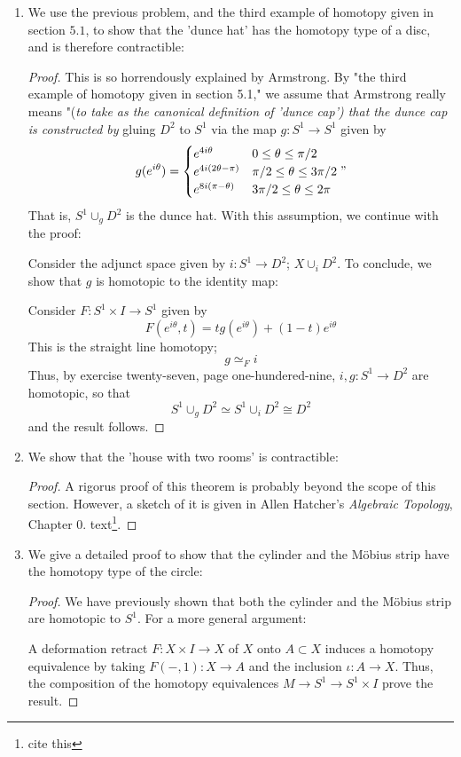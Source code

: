 \documentclass{book}
\begin{document}
\begin{enumerate}[(1)]
    \item We use the previous problem, and the third example of homotopy given in section $5.1$, to show that the 'dunce hat' has the homotopy type of a disc, and is therefore contractible: 
        \begin{proof} This is so horrendously explained by Armstrong. By "the third example of homotopy given in section 5.1," we assume that Armstrong really means "(\textit{to take as the canonical definition of 'dunce cap') that the dunce cap is constructed by } gluing $D^2$ to $S^1$ via the map $g: S^1 \rightarrow S^1$ given by 
            \[ g(e^{i\theta}) = 
            \begin{cases}
                e^{4i\theta} & 0 \leq \theta \leq \pi/2 \\
                e^{4i(2\theta - \pi)} & \pi/2 \leq \theta \leq 3\pi/2 \\
                e^{8i(\pi - \theta)} & 3\pi/2 \leq \theta \leq 2 \pi 
            \end{cases}"
            \]
            That is, $S^1 \cup_g D^2$ is the dunce hat. With this assumption, we continue with the proof: 
            \par Consider the adjunct space given by $i: S^1 \rightarrow D^2$; $X \cup_i D^2$. To conclude, we show that $g$ is homotopic to the identity map: 
            \par Consider $F: S^1 \times I \rightarrow S^1$ given by 
            \[ F( e^{i\theta} , t) = tg(e^{i\theta}) + (1 - t)e^{i\theta}\]
            This is the straight line homotopy; 
            \[g \simeq_F i\]
            Thus, by exercise twenty-seven, page one-hundered-nine, $i,g : S^1 \rightarrow D^2$ are homotopic, so that 
            \[S^1 \cup_g D^2 \simeq S^1 \cup_i D^2 \cong D^2\]
            and the result follows. 
        \end{proof}

    \item We show that the 'house with two rooms' is contractible: 
        \begin{proof} A rigorus proof of this theorem is probably beyond the scope of this section. However, a sketch of it is given in Allen Hatcher's \textit{Algebraic Topology}, Chapter 0.  text\footnote{cite this}.
        \end{proof}

    \item We give a detailed proof to show that the cylinder and the M{\"o}bius strip have the homotopy type of the circle: 
        \begin{proof} We have previously shown that both the cylinder and the M\"obius strip are homotopic to $S^1$. For a more general argument: 
            \par A deformation retract $F:X\times I\rightarrow X$ of $X$ onto $A\subset X$ induces a homotopy equivalence by taking $F(-,1):X\rightarrow A$ and the inclusion $\iota:A\rightarrow X$. Thus, the composition of the homotopy equivalences $M\rightarrow S^1\rightarrow S^1\times I$ prove the result. 
        \end{proof}


\end{enumerate}
\end{document}
